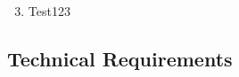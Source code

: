 \begin{enumerate}
\setcounter{enumi}{2}

\item Test123

\end{enumerate}


\subsection{Technical Requirements}





